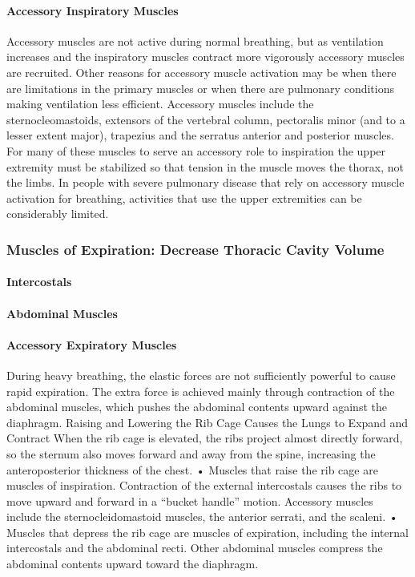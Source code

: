 \paragraph{Accessory Inspiratory Muscles}
Accessory muscles are not active during normal breathing, but as ventilation increases and the inspiratory muscles contract more vigorously accessory muscles are recruited. Other reasons for accessory muscle activation may be when there are limitations in the primary muscles or when there are pulmonary conditions making ventilation less efficient. Accessory muscles include the sternocleomastoids, extensors of the vertebral column, pectoralis minor (and to a lesser extent major), trapezius and the serratus anterior and posterior muscles. For many of these muscles to serve an accessory role to inspiration the upper extremity must be stabilized so that tension in the muscle moves the thorax, not the limbs. In people with severe pulmonary disease that rely on accessory muscle activation for breathing, activities that use the upper extremities can be considerably limited.


\subsubsection{Muscles of Expiration: Decrease Thoracic Cavity Volume}

\paragraph{Intercostals}

\paragraph{Abdominal Muscles}

\paragraph{Accessory Expiratory Muscles}


During heavy breathing, the elastic forces are not sufficiently powerful to cause rapid expiration. The extra force is achieved mainly through contraction of the abdominal muscles, which pushes the abdominal contents upward against the diaphragm. Raising and Lowering the Rib Cage Causes the Lungs to Expand and Contract When the rib cage is elevated, the ribs project almost directly forward, so the sternum also moves forward and away from the spine, increasing the anteroposterior thickness of the chest. • Muscles that raise the rib cage are muscles of inspiration. Contraction of the external intercostals causes the ribs to move upward and forward in a “bucket handle” motion. Accessory muscles include the sternocleidomastoid muscles, the anterior serrati, and the scaleni. • Muscles that depress the rib cage are muscles of expiration, including the internal intercostals and the abdominal recti. Other abdominal muscles compress the abdominal contents upward toward the diaphragm.

